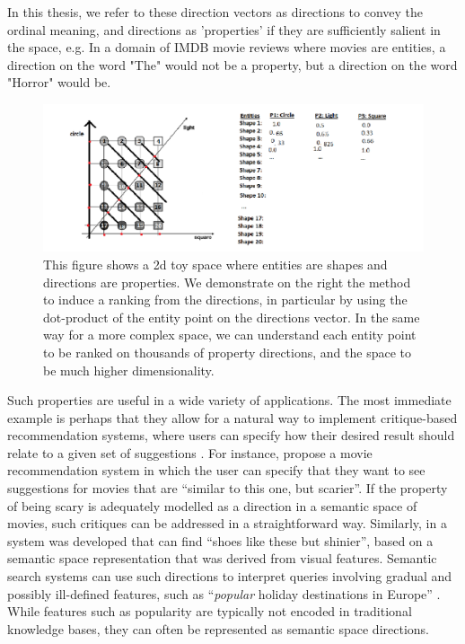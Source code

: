  In this thesis, we refer to these direction vectors as directions to convey the ordinal meaning, and directions as 'properties' if they are sufficiently salient in the space, e.g. In a domain of IMDB movie reviews where movies are entities, a direction on the word "The" would not be a property, but a direction on the word "Horror" would be. 

\begin{figure}[t]
	\includegraphics[width=\textwidth]{images/toydirections.png}
	\centering
	\caption{This figure shows a 2d toy space where entities are shapes and directions are properties. We demonstrate on the right the method to induce a ranking from the directions, in particular by using the dot-product of the entity point on the directions vector. In the same way for a more complex space, we can understand each entity point to be ranked on thousands of property directions, and the space to be much higher dimensionality.}\label{ToyDirection}
\end{figure}

 Such properties are useful in a wide variety of applications. The most immediate example is perhaps that they allow for a natural way to implement critique-based recommendation systems, where users can specify how their desired result should relate to a given set of suggestions \cite{viappiani2006preference}. For instance, \cite{Vig:2012:TGE:2362394.2362395} propose a movie recommendation system in which the user can specify that they want to see suggestions for movies that are ``similar to this one, but scarier''. If the property of being scary is adequately modelled as a direction in a semantic space of movies, such critiques can be addressed in a straightforward way. Similarly, in \cite{kovashka2012whittlesearch} a system was developed that can find ``shoes like these but shinier'', based on a semantic space representation that was derived from visual features. Semantic search systems can use such directions to interpret queries involving gradual and possibly ill-defined features, such as ``\emph{popular} holiday destinations in Europe'' \cite{DBLP:conf/sigir/JameelBS17}. While features such as popularity are typically not encoded in traditional knowledge bases, they can often be represented as semantic space directions.  %

